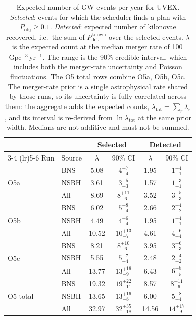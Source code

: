\begin{table}[!htb]
\centering
\renewcommand\arraystretch{1.15}
\setlength{\tabcolsep}{0.22cm}
\caption{Expected number of GW events per year for UVEX. \emph{Selected}: events for which the scheduler finds a plan with $P_\mathrm{obj} \geq 0.1$. \emph{Detected}: expected number of kilonovae recovered, i.e.\ the sum of $P_\mathrm{det}^\mathrm{known}$ over the selected events. $\lambda$ is the expected count at the median merger rate of 100\,$\mathrm{Gpc^{-3}\,yr^{-1}}$. The range is the 90\% credible interval, which includes both the merger-rate uncertainty and Poisson fluctuations. The O5 total rows combine O5a, O5b, O5c. The merger-rate prior is a single astrophysical rate shared by those runs, so its uncertainty is fully correlated across them: the aggregate adds the expected counts, $\lambda_\mathrm{tot} = \sum_r \lambda_r$, and its interval is re-derived from $\ln \lambda_\mathrm{tot}$ at the same prior width. Medians are not additive and must not be summed.}
\label{tab:uvex-selected-detected-1yr}
\begin{tabular}{llcccc}
\toprule
 & & \multicolumn{2}{c}{Selected} & \multicolumn{2}{c}{Detected} \\
\cmidrule(lr){3-4} \cmidrule(lr){5-6}
Run & Source & $\lambda$ & 90\% CI & $\lambda$ & 90\% CI \\
\midrule
\multirow{3}{*}{O5a} & BNS  & 5.08 & $4^{+7}_{-4}$ & 1.95 & $1^{+4}_{-1}$ \\
                     & NSBH & 3.61 & $3^{+5}_{-3}$ & 1.57 & $1^{+3}_{-1}$ \\
                     & All  & 8.69 & $8^{+11}_{-6}$ & 3.52 & $3^{+5}_{-3}$ \\
\midrule
\multirow{3}{*}{O5b} & BNS  & 6.02 & $5^{+8}_{-4}$ & 2.66 & $2^{+4}_{-2}$ \\
                     & NSBH & 4.49 & $4^{+6}_{-4}$ & 1.95 & $1^{+4}_{-1}$ \\
                     & All  & 10.52 & $10^{+13}_{-7}$ & 4.61 & $4^{+6}_{-4}$ \\
\midrule
\multirow{3}{*}{O5c} & BNS  & 8.21 & $8^{+10}_{-6}$ & 3.95 & $3^{+6}_{-3}$ \\
                     & NSBH & 5.55 & $5^{+7}_{-4}$ & 2.48 & $2^{+4}_{-2}$ \\
                     & All  & 13.77 & $13^{+16}_{-9}$ & 6.43 & $6^{+8}_{-5}$ \\
\midrule
\multirow{3}{*}{O5 total} & BNS  & 19.32 & $19^{+22}_{-11}$ & 8.57 & $8^{+11}_{-6}$ \\
                          & NSBH & 13.65 & $13^{+16}_{-8}$ & 6.00 & $5^{+8}_{-4}$ \\
                          & All  & 32.97 & $32^{+35}_{-18}$ & 14.56 & $14^{+17}_{-9}$ \\
\bottomrule
\end{tabular}
\end{table}
